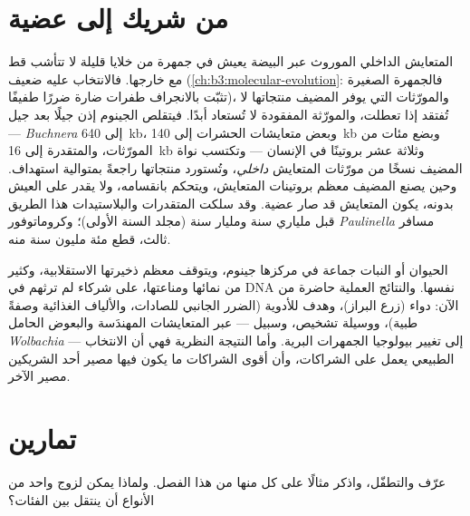 \section{من شريك إلى عضية}

\begin{proposition}\label{prop:b3:microbiomes:reduction}
المتعايش الداخلي الموروث عبر البيضة يعيش في جمهرة من خلايا
قليلة لا تتأشب قط مع خارجها. فالانتخاب عليه ضعيف
(\cref{ch:b3:molecular-evolution}: فالجمهرة الصغيرة تثبّت
بالانجراف طفرات ضارة ضررًا طفيفًا)، والمورّثات التي يوفر
المضيف منتجاتها لا تُفتقد إذا تعطلت، والمورّثة المفقودة لا
تُستعاد أبدًا. فيتقلص الجينوم إذن جيلًا بعد جيل ---
\emph{Buchnera} إلى \qty{640}{kb}، وبعض متعايشات الحشرات
إلى \qty{140}{kb} وبضع مئات من المورّثات، والمتقدرة إلى
\qty{16}{kb} وثلاثة عشر بروتينًا في الإنسان --- وتكتسب نواة
المضيف نسخًا من مورّثات المتعايش \emph{
داخلي}، وتُستورد منتجاتها راجعةً بمتوالية استهداف. وحين
يصنع المضيف معظم بروتينات المتعايش، ويتحكم بانقسامه، ولا
يقدر على العيش بدونه، يكون المتعايش قد صار عضية. وقد سلكت
المتقدرات والبلاستيدات هذا الطريق قبل ملياري سنة ومليار
سنة (مجلد السنة الأولى)؛ وكروماتوفور \emph{Paulinella}
مسافر ثالث، قطع مئة مليون سنة منه.
\end{proposition}

\begin{remark}\label{rem:b3:microbiomes:individual}
الحيوان أو النبات جماعة في مركزها جينوم، ويتوقف معظم
ذخيرتها الاستقلابية، وكثير من نمائها ومناعتها، على شركاء
لم ترثهم في DNA نفسها. والنتائج العملية حاضرة من الآن:
 دواء (زرع البراز)، وهدف للأدوية (الضرر
الجانبي للصادات، والألياف الغذائية وصفةً طبية)، ووسيلة
تشخيص، وسبيل --- عبر المتعايشات المهندَسة والبعوض الحامل
\emph{Wolbachia} --- إلى تغيير بيولوجيا الجمهرات البرية.
وأما النتيجة النظرية فهي أن الانتخاب الطبيعي يعمل على
الشراكات، وأن أقوى الشراكات ما يكون فيها مصير أحد الشريكين
مصير الآخر.
\end{remark}

\section{تمارين}

\begin{exercise}[$\star$]\label{exo:b3:microbiomes:1}
عرّف   والتطفّل، واذكر مثالًا على كل منها
من هذا الفصل. ولماذا يمكن لزوج واحد من الأنواع أن ينتقل
بين الفئات؟
\end{exercise}

